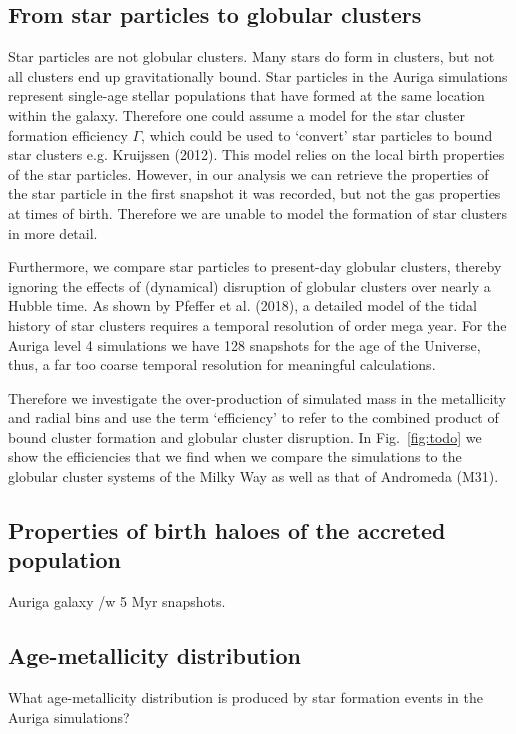 \documentclass[a4paper,fleqn,usenatbib]{mnras}
\begin{document}
\subsection{From star particles to globular clusters}
\label{sec:star-to-gc}
Star particles are not globular clusters. Many stars do form in clusters, but
not all clusters end up gravitationally bound. Star particles in the
Auriga simulations represent single-age stellar populations that have formed
at the same location within the galaxy. Therefore one could assume a model
for the star cluster formation efficiency $\Gamma$, which could be used to 
`convert' star particles to bound star clusters e.g. Kruijssen (2012). This 
model relies on the local birth properties of the star particles. However, 
in our analysis we can retrieve the properties of the star particle in the 
first snapshot it was recorded, but not the gas properties at times of birth.
Therefore we are unable to model the formation of star clusters in more detail.

Furthermore, we compare star particles to present-day globular clusters, thereby
ignoring the effects of (dynamical) disruption of globular clusters over nearly
a Hubble time. As shown by Pfeffer et al. (2018), a detailed model of the tidal
history of star clusters requires a temporal resolution of order mega year. For
the Auriga level 4 simulations we have 128 snapshots for the age of the Universe,
thus, a far too coarse temporal resolution for meaningful calculations.

Therefore we investigate the over-production of simulated mass in the metallicity
and radial bins and use the term `efficiency' to refer to the combined product
of bound cluster formation and globular cluster disruption. In Fig.~\ref{fig:todo} 
we show the efficiencies that we find when we compare the simulations to the 
globular cluster systems of the Milky Way as well as that of Andromeda (M31).



\subsection{Properties of birth haloes of the accreted population}
\label{sec:birth-properties-of-accreted-gc-candidates}

Auriga galaxy /w 5 Myr snapshots.



\subsection{Age-metallicity distribution}
\label{sec:agemetallicity}
What age-metallicity distribution is produced by star formation events in the Auriga simulations?
\end{document}
